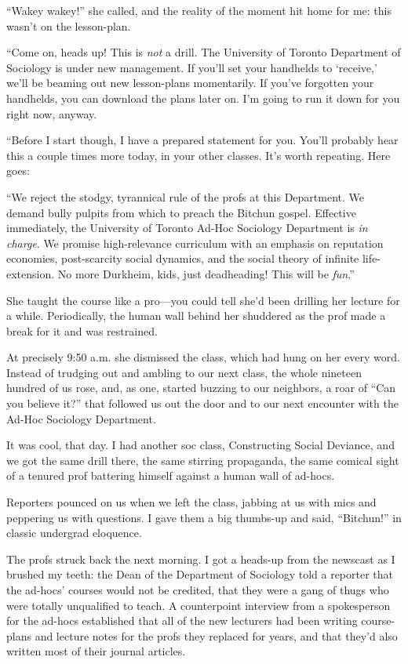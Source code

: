 “Wakey wakey!” she called, and the reality of the moment hit home
for me: this wasn't on the lesson-plan.

“Come on, heads up! This is \emph{not} a drill. The University of
Toronto Department of Sociology is under new management. If you'll
set your handhelds to ‘receive,’ we'll be beaming out new
lesson-plans momentarily. If you've forgotten your handhelds, you
can download the plans later on. I'm going to run it down for you
right now, anyway.

“Before I start though, I have a prepared statement for you. You'll
probably hear this a couple times more today, in your other
classes. It's worth repeating. Here goes:

“We reject the stodgy, tyrannical rule of the profs at this
Department. We demand bully pulpits from which to preach the
Bitchun gospel. Effective immediately, the University of Toronto
Ad-Hoc Sociology Department is \emph{in charge}. We promise
high-relevance curriculum with an emphasis on reputation economies,
post-scarcity social dynamics, and the social theory of infinite
life-extension. No more Durkheim, kids, just deadheading! This will
be \emph{fun}.”

She taught the course like a pro—you could tell she'd been drilling
her lecture for a while. Periodically, the human wall behind her
shuddered as the prof made a break for it and was restrained.

At precisely 9:50 a.m. she dismissed the class, which had hung on
her every word. Instead of trudging out and ambling to our next
class, the whole nineteen hundred of us rose, and, as one, started
buzzing to our neighbors, a roar of “Can you believe it?” that
followed us out the door and to our next encounter with the Ad-Hoc
Sociology Department.

It was cool, that day. I had another soc class, Constructing Social
Deviance, and we got the same drill there, the same stirring
propaganda, the same comical sight of a tenured prof battering
himself against a human wall of ad-hocs.

Reporters pounced on us when we left the class, jabbing at us with
mics and peppering us with questions. I gave them a big thumbs-up
and said, “Bitchun!” in classic undergrad eloquence.

The profs struck back the next morning. I got a heads-up from the
newscast as I brushed my teeth: the Dean of the Department of
Sociology told a reporter that the ad-hocs' courses would not be
credited, that they were a gang of thugs who were totally
unqualified to teach. A counterpoint interview from a spokesperson
for the ad-hocs established that all of the new lecturers had been
writing course-plans and lecture notes for the profs they replaced
for years, and that they'd also written most of their journal
articles.

